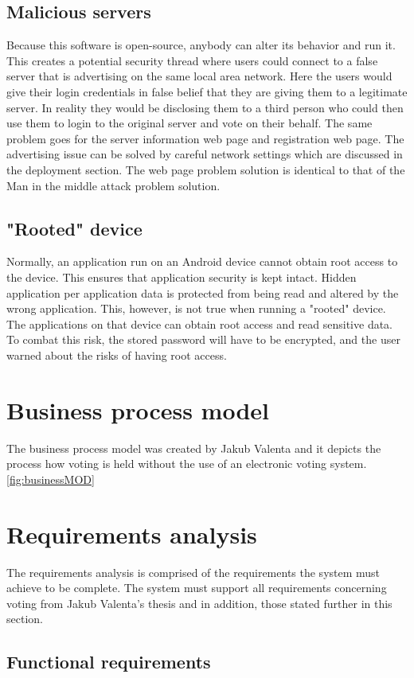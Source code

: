 \documentclass[11pt,twoside,a4paper]{book}
\begin{document}
\subsection{Malicious servers}
Because this software is open-source, anybody can alter its behavior and run it. This creates a potential security thread where users could connect to a false server that is advertising on the same local area network. Here the users would give their login credentials in false belief that they are giving them to a legitimate server. In reality they would be disclosing them to a third person who could then use them to login to the original server and vote on their behalf. The same problem goes for the server information web page and registration web page. The advertising issue can be solved by careful network settings which are discussed in the deployment section. The web page problem solution is identical to that of the Man in the middle attack problem solution.
\subsection{"Rooted" device}
Normally, an application run on an Android device cannot obtain root access to the device. This ensures that application security is kept intact. Hidden application per application data is protected from being read and altered by the wrong application. This, however, is not true when running a "rooted" device. The applications on that device can obtain root access and read sensitive data. To combat this risk, the stored password will have to be encrypted, and the user warned about the risks of having root access.


\section{Business process model}
The business process model was created by Jakub Valenta and it depicts the process how voting is held without the use of an electronic voting system. \cite{bakalarkaJV} \ref{fig:businessMOD}

\section{Requirements analysis}
The requirements analysis is comprised of the requirements the system must achieve to be complete. The system must support all requirements concerning voting from Jakub Valenta's thesis and in addition, those stated further in this section.
\subsection{Functional requirements}
\end{document}
